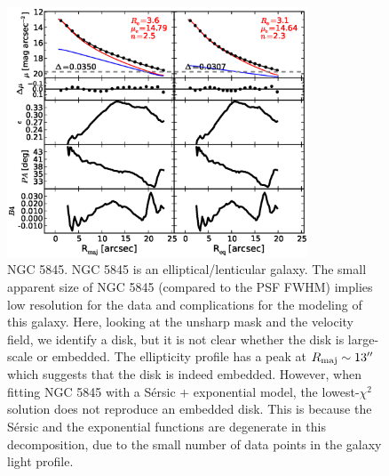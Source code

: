 \documentclass[preprint2]{emulateapj}
\newcommand{\fitfigurewidth}{0.8\textwidth}
\begin{document}
  \begin{figure}[h]
  \begin{center}
  \includegraphics[width=\fitfigurewidth]{images/n5845_1Dfit.eps}
  \caption{NGC 5845.
  NGC 5845 is an elliptical/lenticular galaxy. 
  The small apparent size of NGC 5845 (compared to the PSF FWHM) implies low resolution for the data 
  and complications for the modeling of this galaxy.
  Here, looking at the unsharp mask and the velocity field, we identify a disk, but it is not clear whether the disk is large-scale or embedded.
  The ellipticity profile has a peak at $R_{\rm maj} \sim 13''$ which suggests that the disk is indeed embedded.
  However, when fitting NGC 5845 with a S\'ersic + exponential model, 
  the lowest-$\chi^2$ solution does not reproduce an embedded disk.
  This is because the S\'ersic and the exponential functions are degenerate in this decomposition, 
  due to the small number of data points in the galaxy light profile.
  }
  \end{center}
  \end{figure}
\end{document}
